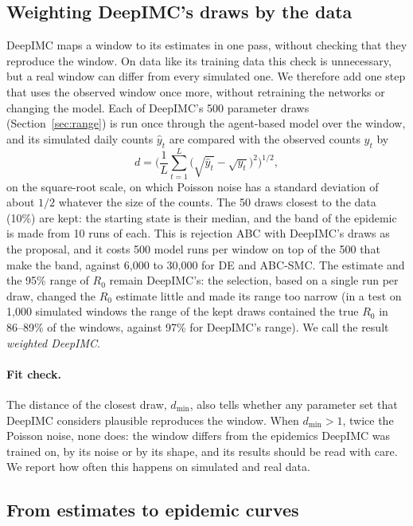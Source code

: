 \documentclass[12pt]{article}
\begin{document}
\subsection{Weighting DeepIMC's draws by the data}\label{sec:weighting}

DeepIMC maps a window to its estimates in one pass, without checking that they reproduce the window. On data
like its training data this check is unnecessary, but a real window can differ from every simulated one. We
therefore add one step that uses the observed window once more, without retraining the networks or changing the
model. Each of DeepIMC's 500 parameter draws (Section~\ref{sec:range}) is run once through the agent-based model
over the window, and its simulated daily counts $\hat y_t$ are compared with the observed counts $y_t$ by
\begin{equation}\label{eq:fitdist}
d = \Big(\frac{1}{L}\sum_{t=1}^{L}\big(\sqrt{\hat y_t}-\sqrt{y_t}\big)^2\Big)^{1/2},
\end{equation}
on the square-root scale, on which Poisson noise has a standard deviation of about $1/2$ whatever the size of
the counts. The 50 draws closest to the data (10\%) are kept: the starting state is their median, and the band
of the epidemic is made from 10 runs of each. This is rejection ABC with DeepIMC's draws as the proposal, and it
costs 500 model runs per window on top of the 500 that make the band, against 6,000 to 30,000 for DE and
ABC-SMC. The estimate and the 95\% range of $R_0$ remain DeepIMC's: the selection, based on a single run per
draw, changed the $R_0$ estimate little and made its range too narrow (in a test on 1,000 simulated windows the
range of the kept draws contained the true $R_0$ in 86--89\% of the windows, against 97\% for DeepIMC's range).
We call the result \emph{weighted DeepIMC}.

\paragraph{Fit check.} The distance of the closest draw, $d_{\min}$, also tells whether any parameter set that
DeepIMC considers plausible reproduces the window. When $d_{\min} > 1$, twice the Poisson noise, none does: the
window differs from the epidemics DeepIMC was trained on, by its noise or by its shape, and its results should be
read with care. We report how often this happens on simulated and real data.

\subsection{From estimates to epidemic curves}\label{sec:prediction}
\end{document}
